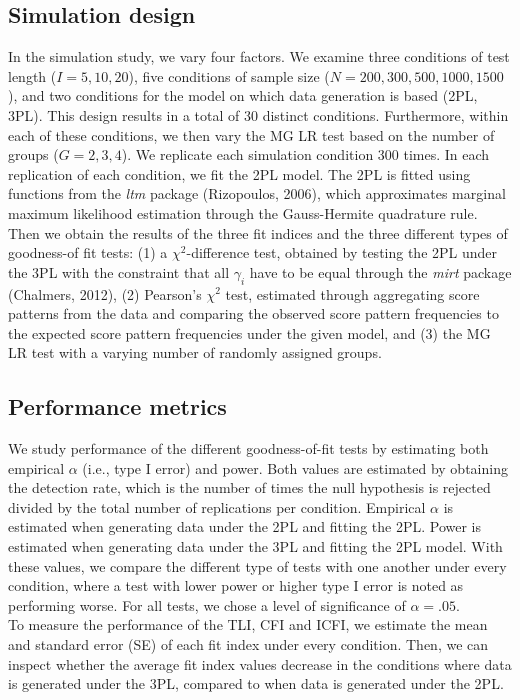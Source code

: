 \documentclass[Royal,sageapa,times,doublespace]{sagej}
\begin{document}
\subsection{Simulation design}
In the simulation study, we vary four factors. We examine three conditions of test length ($I = 5, 10, 20$), five conditions of sample size ($N = 200, 300, 500, 1000, 1500$), and two conditions for the model on which data generation is based (2PL, 3PL). This design results in a total of 30 distinct conditions. Furthermore, within each of these conditions, we then vary the MG LR test based on the number of groups ($G = 2, 3, 4$). We replicate each simulation condition 300 times. In each replication of each condition, we fit the 2PL model. The 2PL is fitted using functions from the \textit{ltm} package (Rizopoulos, 2006), which approximates marginal maximum likelihood estimation through the Gauss-Hermite quadrature rule. Then we obtain the results of the three fit indices and the three different types of goodness-of fit tests: (1) a $\chi^2$-difference test, obtained by testing the 2PL under the 3PL with the constraint that all $\gamma_i$ have to be equal through the \textit{mirt} package (Chalmers, 2012), (2) Pearson's $\chi^2$ test, estimated through aggregating score patterns from the data and comparing the observed score pattern frequencies to the expected score pattern frequencies under the given model, and (3) the MG LR test with a varying number of randomly assigned groups. 
\subsection{Performance metrics}
We study performance of the different goodness-of-fit tests by estimating both empirical $\alpha$ (i.e., type I error) and power. Both values are estimated by obtaining the detection rate, which is the number of times the null hypothesis is rejected divided by the total number of replications per condition. Empirical $\alpha$ is estimated when generating data under the 2PL and fitting the 2PL. Power is estimated when generating data under the 3PL and fitting the 2PL model. With these values, we compare the different type of tests with one another under every condition, where a test with lower power or higher type I error is noted as performing worse. For all tests, we chose a level of significance of $\alpha = .05$. \\
\indent To measure the performance of the TLI, CFI and ICFI, we estimate the mean and standard error (SE) of each fit index under every condition. Then, we can inspect whether the average fit index values decrease in the conditions where data is generated under the 3PL, compared to when data is generated under the 2PL. 
\end{document}
